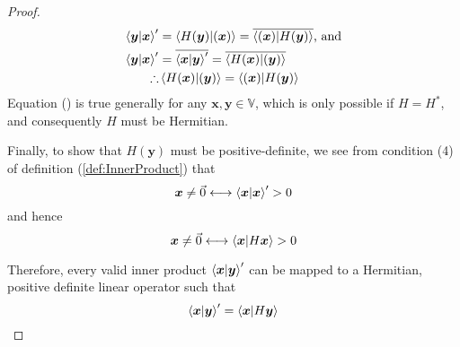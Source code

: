 \documentclass{article}
\newcommand{\B}[1]{\boldsymbol{#1}}
\newtheorem{theorem}{Theorem}[section]
\theoremstyle{definition}
\theoremstyle{remark}
\begin{document}
\begin{proof}
   \begin{align}
    \braket{\B{y}|\B{x}}^\prime &= \braket{H(\B{y})|(\B{x})} = \overline{\braket{(\B{x})|H(\B{y})}} \text{, and} \nonumber\\
    \braket{\B{y}|\B{x}}^\prime &= \overline{\braket{\B{x}|\B{y}}^\prime} = \overline{\braket{H(\B{x})|(\B{y})}}  \nonumber\\
    \therefore & \braket{H(\B{x})|(\B{y})} =  \braket{(\B{x})|H(\B{y})} \label{eq:innerProductSymmetry}
   \end{align}
   Equation () is true generally for any $\B{x}, \B{y} \in \mathbb{V}$, which is only possible if
  $H = H^*$, and consequently $H$ must be Hermitian.

   Finally, to show that $H(\B{y})$ must be positive-definite, we see from condition (4) of definition (\ref{def:InnerProduct}) 
   that
   \begin{equation*}
    \B{x} \neq \vec{0} \longleftrightarrow \braket{\B{x}|\B{x}}^\prime > 0 
   \end{equation*}
   and hence 
   \begin{equation}
    \B{x} \neq \vec{0} \longleftrightarrow \braket{\B{x}|H\B{x}} > 0 \label{eq:proofPosDef}
   \end{equation}


   Therefore, every valid inner product $\braket{\B{x}|\B{y}}^\prime$ can be mapped to a 
   Hermitian, positive definite linear operator such that 
   \begin{equation}
     \braket{\B{x}|\B{y}}^\prime = \braket{\B{x}|H\B{y}}
   \end{equation}

\end{proof}
  

  \pagebreak


\end{document}
